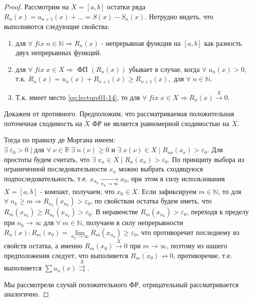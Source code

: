 \begin{proof}
	Рассмотрим на $X = [a,b]$ остатки ряда $R_n(x) = u_{n+1}(x) + \ldots = S(x) - S_n(x)$.	Нетрудно видеть, что выполняются следующие свойства:
	\begin{enumerate}
		\item для $\forall \; fix \; n \in \mathbb{N} \Rightarrow R_n (x)$ - непрерывная функция на $[a,b]$ как разность двух непрерывных функций.
		\item для $\forall \; fix \; x \in X \Rightarrow$ $\text{ФП}$ $(R_n(x))$ убывает в случае, когда $\forall \; u_n (x) > 0$, т.к. \newline $R_n(x) = u_n(x) + R_{n+1}(x) \geqslant R_{n+1}(x), \text{ для } \forall \; n \in \mathbb{N}$.
		\item Т.к. имеет место \eqref{eq:lecture01-14}, то для $\forall \; fix \; x \in X \Rightarrow R_n(x) \overset{X}{\to} 0$.
	\end{enumerate}
	Докажем от противного. Предположим, что рассматриваемая положительная поточечная сходимость на $X$ ФР не является равномерной сходимостью на $X$.

	Тогда по правилу де Моргана имеем: $\exists \; \varepsilon_0 > 0 \; | \; \text{для } \forall \; \nu \in \mathbb{R} \; \exists \; n (\nu) \geqslant 0 \text{ и } \exists \; x (\nu) \in X \; | \; R_{n \nu} (x_\nu) > \varepsilon_0$. Для простоты будем считать, что $\exists \; x_n \in X \; | \; R_n (x_n) > \varepsilon_0$. По принципу выбора из ограниченной последовательности $x_n$ можно выбрать сходящуюся подпоследовательность, т.е. $x_{n_k} \underset{n_k \to \infty}{\longrightarrow} x_0$, при этом в силу использования $X = [a,b]$ - компакт, получаем, что $x_0 \in X$. Если зафиксируем $m \in \mathbb{N}$, то для $\forall \; n_k \geqslant m \Rightarrow R_{n_k} (x_{n_k}) > \varepsilon_0$, по свойствам остатка будем иметь, что $R_{m} (x_{n_k}) \geqslant R_{n_k} (x_{n_k}) > \varepsilon_0$. В неравенстве $R_m (x_{n_k}) > \varepsilon_0$, переходя к пределу при $n_k \to \infty \; \text{для } \forall \; m \in \mathbb{N}$, получаем в силу непрерывности $R_n(x): R_m (x_0) = \lim\limits_{n_k \to \infty} R_m(x_{n_k}) \geqslant \varepsilon_0$, что противоречит последнему из свойств остатка, а именно $R_m(x_0) \overset{X}{\longrightarrow} 0$ при $m \to \infty$, поэтому из нашего предположения следует, что выполняется $R_m(x_0) \not\to 0$, противоречие, т.е. выполняется $\sum u_n(x) \overset{X}{\rightrightarrows}$.
	
	Мы рассмотрели случай положительного ФР, отрицательный рассматривается аналогично.
\end{proof}
